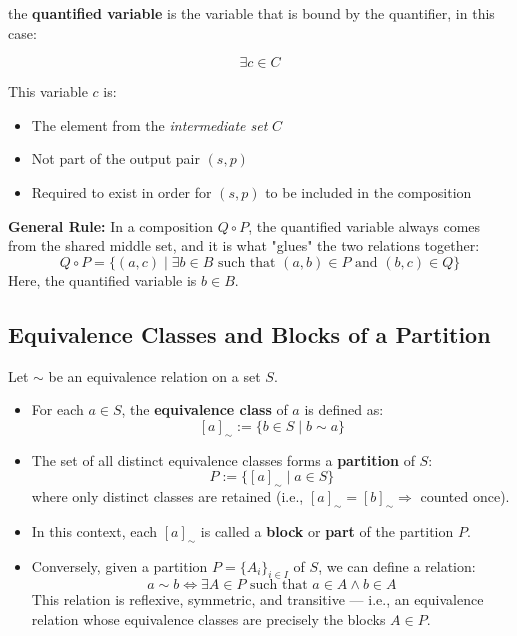 \documentclass[10pt]{article}
\theoremstyle{plain}
\theoremstyle{definition}
\begin{document}
	the \textbf{quantified variable} is the variable that is bound by the quantifier, in this case:
	
	\[
	\exists c \in C
	\]
	
	This variable $c$ is:
	\begin{itemize}
		\item The element from the \emph{intermediate set} $C$
		\item Not part of the output pair $(s, p)$
		\item Required to exist in order for $(s, p)$ to be included in the composition
	\end{itemize}
	
	\textbf{General Rule:}  
	In a composition $Q \circ P$, the quantified variable always comes from the shared middle set, and it is what "glues" the two relations together:
	\[
	Q \circ P = \{ (a, c) \mid \exists b \in B \text{ such that } (a, b) \in P \text{ and } (b, c) \in Q \}
	\]
	Here, the quantified variable is $b \in B$.
	
	
	
	\subsection*{Equivalence Classes and Blocks of a Partition}
	
	Let $\sim$ be an equivalence relation on a set $S$.
	
	\begin{itemize}
		\item For each $a \in S$, the \textbf{equivalence class} of $a$ is defined as:
		\[
		[a]_\sim := \{ b \in S \mid b \sim a \}
		\]
		\item The set of all distinct equivalence classes forms a \textbf{partition} of $S$:
		\[
		P := \{ [a]_\sim \mid a \in S \}
		\]
		where only distinct classes are retained (i.e., $[a]_\sim = [b]_\sim \Rightarrow$ counted once).
		
		\item In this context, each $[a]_\sim$ is called a \textbf{block} or \textbf{part} of the partition $P$.
		
		\item Conversely, given a partition $P = \{A_i\}_{i \in I}$ of $S$, we can define a relation:
		\[
		a \sim b \iff \exists A \in P \text{ such that } a \in A \wedge b \in A
		\]
		This relation is reflexive, symmetric, and transitive — i.e., an equivalence relation whose equivalence classes are precisely the blocks $A \in P$.
	\end{itemize}
	
\end{document}
